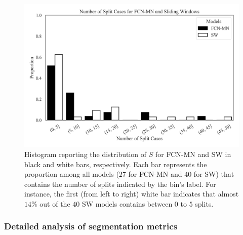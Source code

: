 \documentclass[a4paper,authoryear,review]{elsarticle}
\begin{document}
\begin{figure}
	\centering
	\includegraphics[width=\textwidth]{figures/PPP_split_distribution.png}
	\caption{Histogram reporting the distribution of $S$ for FCN-MN and SW in black and white bars, respectively. Each bar represents the proportion among all models ($27$ for FCN-MN  and $40$ for SW) that contains the number of splits indicated by the bin’s label. For instance, the first (from left to right) white bar indicates that almost $14\%$ out of the $40$ SW models contains between $0$ to $5$ splits. }
	\label{fig:number-of-split}
\end{figure}

\subsubsection{Detailed analysis of segmentation metrics}
\end{document}
